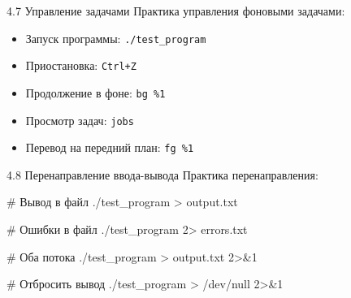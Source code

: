 \documentclass[
  ignorenonframetext,
  aspectratio=169,
  russian,
]{beamer}
\newenvironment{Shaded}{\begin{snugshade}}{\end{snugshade}}
\newcommand{\CommentTok}[1]{\textcolor[rgb]{0.37,0.37,0.37}{#1}}
\newcommand{\DecValTok}[1]{\textcolor[rgb]{0.68,0.00,0.00}{#1}}
\newcommand{\ExtensionTok}[1]{\textcolor[rgb]{0.00,0.23,0.31}{#1}}
\newcommand{\NormalTok}[1]{\textcolor[rgb]{0.00,0.23,0.31}{#1}}
\newcommand{\OperatorTok}[1]{\textcolor[rgb]{0.37,0.37,0.37}{#1}}
\providecommand{\tightlist}{%
  \setlength{\itemsep}{0pt}\setlength{\parskip}{0pt}}
\begin{document}
\begin{frame}[fragile]{4.7 Управление задачами}
\label{ux443ux43fux440ux430ux432ux43bux435ux43dux438ux435-ux437ux430ux434ux430ux447ux430ux43cux438-1}
Практика управления фоновыми задачами:

\begin{itemize}[<+->]
\tightlist
\item
  Запуск программы: \texttt{./test\_program}
\item
  Приостановка: \texttt{Ctrl+Z}
\item
  Продолжение в фоне: \texttt{bg\ \%1}
\item
  Просмотр задач: \texttt{jobs}
\item
  Перевод на передний план: \texttt{fg\ \%1}
\end{itemize}
\end{frame}

\begin{frame}[fragile]{4.8 Перенаправление ввода-вывода}
\label{ux43fux435ux440ux435ux43dux430ux43fux440ux430ux432ux43bux435ux43dux438ux435-ux432ux432ux43eux434ux430-ux432ux44bux432ux43eux434ux430}
Практика перенаправления:

\begin{Shaded}
\begin{Highlighting}[]
\CommentTok{\# Вывод в файл}
\ExtensionTok{./test\_program} \OperatorTok{\textgreater{}}\NormalTok{ output.txt}

\CommentTok{\# Ошибки в файл}
\ExtensionTok{./test\_program} \DecValTok{2}\OperatorTok{\textgreater{}}\NormalTok{ errors.txt}

\CommentTok{\# Оба потока}
\ExtensionTok{./test\_program} \OperatorTok{\textgreater{}}\NormalTok{ output.txt }\DecValTok{2}\OperatorTok{\textgreater{}\&}\DecValTok{1}

\CommentTok{\# Отбросить вывод}
\ExtensionTok{./test\_program} \OperatorTok{\textgreater{}}\NormalTok{ /dev/null }\DecValTok{2}\OperatorTok{\textgreater{}\&}\DecValTok{1}
\end{Highlighting}
\end{Shaded}
\end{frame}
\end{document}
